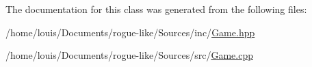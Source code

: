 The documentation for this class was generated from the following files\-:\begin{DoxyCompactItemize}
\item 
/home/louis/\-Documents/rogue-\/like/\-Sources/inc/\hyperlink{_game_8hpp}{Game.\-hpp}\item 
/home/louis/\-Documents/rogue-\/like/\-Sources/src/\hyperlink{_game_8cpp}{Game.\-cpp}\end{DoxyCompactItemize}
